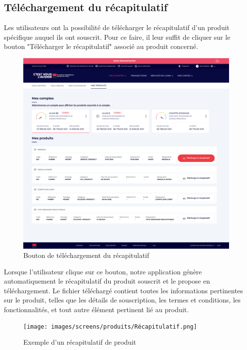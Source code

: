 \subsection{Téléchargement du récapitulatif}
Les utilisateurs ont la possibilité de télécharger le récapitulatif d'un produit spécifique auquel ils ont souscrit. Pour ce faire, il leur suffit de cliquer sur le bouton "Télécharger le récapitulatif" associé au produit concerné.\\

\begin{figure}[!ht]
    \centering %
        \includegraphics[width=16cm]{images/screens/produits/desktop-button.png}
    \caption{Bouton de téléchargement du récapitulatif}
\end{figure}

Lorsque l'utilisateur clique sur ce bouton, notre application génère automatiquement le récapitulatif du produit souscrit et le propose en téléchargement. Le fichier téléchargé contient toutes les informations pertinentes sur le produit, telles que les détails de souscription, les termes et conditions, les fonctionnalités, et tout autre élément pertinent lié au produit.
\begin{figure}[!ht]
    \centering %
        \texttt{[image: images/screens/produits/Récapitulatif.png]}
    \caption{Exemple d'un récapitulatif de produit}
\end{figure}
\newpage

